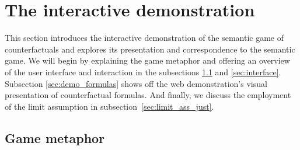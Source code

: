 \documentclass[a4paper,american,10pt]{paper}
\theoremstyle{definition}\newtheorem{lemma}[thm]{Lemma}
\theoremstyle{definition}\newtheorem{proposition}[thm]{Proposition}
\theoremstyle{definition}\newtheorem{corollary}[thm]{Corollary}
\theoremstyle{definition}\newtheorem{definition}{Definition}
\begin{document}
\section{The interactive demonstration}\label{sec:demo}
This section introduces the interactive demonstration of the semantic game of counter\-factuals and explores its presentation and correspondence to the semantic game. We will begin by explaining the game metaphor and offering an overview of the user interface and interaction in the subsections \ref{sec:metaphor} and \ref{sec:interface}. Subsection \ref{sec:demo_formulas} shows off the web demonstration's visual presentation of counterfactual formulas. And finally, we discuss the employment of the limit assumption in subsection~\ref{sec:limit_ass_just}.
\subsection{Game metaphor}\label{sec:metaphor}
\end{document}
